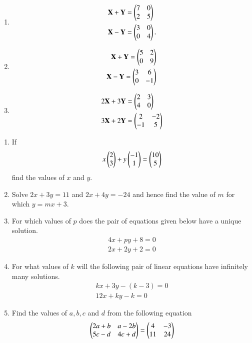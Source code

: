 \begin{multicols}{2}
\begin{enumerate}[label=\thesubsection.\arabic*,ref=\thesubsection.\theenumi]
\item 
\begin{align*}
	\mathbf{X}+\mathbf{Y}&= \begin{pmatrix}7 & 0 \\ 2 & 5\end{pmatrix} 
\\
		\mathbf{X}-\mathbf{Y}&=\begin{pmatrix}3 & 0 \\ 0 & 4\end{pmatrix}.
\end{align*}
\item  
\begin{align*}
\mathbf{X}+\mathbf{Y}=\begin{pmatrix}5&2\\0&9\end{pmatrix}
	\\
\mathbf{X}-\mathbf{Y}=\begin{pmatrix}3&6\\0&-1\end{pmatrix}
\end{align*}
\item 
\begin{align*}
	2\mathbf{X}+3\mathbf{Y}&=\begin{pmatrix}2 & 3 \\ 4 & 0\end{pmatrix}  
	\\
	3\mathbf{X}+2\mathbf{Y}&=\begin{pmatrix}2 & -2 \\ -1 & 5\end{pmatrix}
\end{align*}
\end{enumerate}
\end{multicols}
\begin{enumerate}[label=\thesubsection.\arabic*,ref=\thesubsection.\theenumi,resume*]
\item If 
\begin{align}
	x \begin{pmatrix}2 \\ 3\end{pmatrix} + y \begin{pmatrix}-1 \\ 1\end{pmatrix}= \begin{pmatrix}10 \\ 5\end{pmatrix}
\end{align}
find the values of $x$ and $y$.
\item Solve $2x+3y=11$ and $2x+4y=-24$ and hence find the value of $m$ for which $y=mx+3$.
\item For which values of $p$ does the pair of equations given below have a unique solution.
\begin{align}
4x+py+8 = 0 \\ 2x+2y+2 = 0
\end{align}
\item For what values of $k$ will the following pair of linear equations have infinitely many solutions.
\begin{align}
kx+3y-(k-3) = 0 \\ 12x+ky-k = 0
\end{align}
\item Find the values of $a, b, c$ and $d$ from the following equation 
\begin{align} 
\begin{pmatrix}2a+b&a-2b\\5c-d&4c+d\end{pmatrix} = \begin{pmatrix}4&-3\\11&24\end{pmatrix} 
\end{align}
\end{enumerate}
